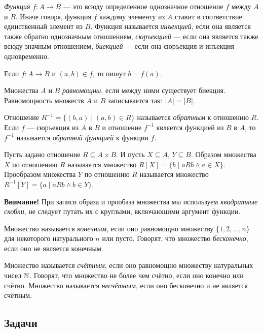 \textit{Функция} $f:A\to B$ --- это всюду определенное однозначное отношение $f$ между $A$ и $B$. Иначе говоря, функция $f$ каждому элементу из $A$ ставит в соответствие единственный элемент из $B$. Функция называется \ipunkt \textit{инъекцией}, если она является также обратно однозначным отношением, \ipunkt \textit{сюръекцией} --- если она является также всюду значным отношением, \ipunkt \textit{биекцией} --- если она сюръекция и инъекция одновременно.

Если $f:A\to B$ и $(a,b)\in f$, то пишут $b=f(a)$.

Множества $A$ и $B$ \textit{равномощны}, если между ними существует биекция. Равномощность множеств $A$ и $B$ записывается так: $|A|=|B|$.

Отношение $R^{-1} = \{(b,a)\mid (a,b)\in R\}$ называется \textit{обратным} к отношению $R$. Если $f$ --- сюръекция из $A$ в $B$ и отношение $f^{-1}$ является функцией из $B$ в $A$, то $f^{-1}$ называется \textit{обратной функцией} к функции $f$.

Пусть задано отношение $R\subseteq A\times B$. И пусть $X\subseteq A$, $Y\subseteq B$. Образом множества $X$ по отношению $R$ называется множество $R[X]=\{b\mid aRb\land a\in X\}$. Прообразом множества $Y$ по отношению $R$ называется множество $R^{-1}[Y]=\{a\mid aRb\land b\in Y\}$.

\textbf{Внимание!} При записи образа и прообаза множества мы используем \textit{квадратные скобки}, не следует путать их с круглыми, включающими аргумент функции.

Множество называется \textit{конечным}, если оно равномощно множеству $\{1, 2, \dots , n\}$ для
некоторого натурального $n$ или пусто. Говорят, что множество \textit{бесконечно}, если оно не является
конечным.

Множество называется \textit{счётным}, если оно равномощно множеству натуральных чисел $\mathbb N$.
 Говорят, что множество не более чем счётно, если оно конечно или счётно. Множество называется
 \textit{ несчётным}, если оно бесконечно и не является счётным.


\subsection*{Задачи}

